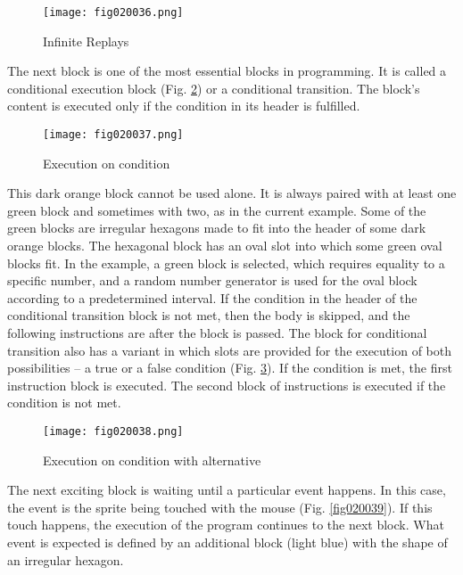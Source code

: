 \begin{figure}[H]
   \centering
   \texttt{[image: fig020036.png]}
   \caption{Infinite Replays}
\label{fig020036}
\end{figure}

The next block is one of the most essential blocks in programming. It is called a conditional execution block (Fig. \ref{fig020037}) or a conditional transition. The block's content is executed only if the condition in its header is fulfilled.

\begin{figure}[H]
   \centering
   \texttt{[image: fig020037.png]}
   \caption{Execution on condition}
\label{fig020037}
\end{figure}

This dark orange block cannot be used alone. It is always paired with at least one green block and sometimes with two, as in the current example. Some of the green blocks are irregular hexagons made to fit into the header of some dark orange blocks. The hexagonal block has an oval slot into which some green oval blocks fit. In the example, a green block is selected, which requires equality to a specific number, and a random number generator is used for the oval block according to a predetermined interval. If the condition in the header of the conditional transition block is not met, then the body is skipped, and the following instructions are after the block is passed. The block for conditional transition also has a variant in which slots are provided for the execution of both possibilities – a true or a false condition (Fig. \ref{fig020038}). If the condition is met, the first instruction block is executed. The second block of instructions is executed if the condition is not met.

\begin{figure}[H]
   \centering
   \texttt{[image: fig020038.png]}
   \caption{Execution on condition with alternative}
\label{fig020038}
\end{figure}

The next exciting block is waiting until a particular event happens. In this case, the event is the sprite being touched with the mouse (Fig. \ref{fig020039}). If this touch happens, the execution of the program continues to the next block. What event is expected is defined by an additional block (light blue) with the shape of an irregular hexagon.

